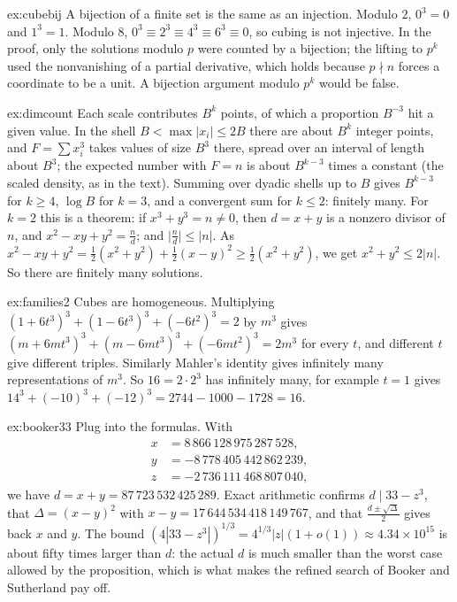 \begin{solution}{ex:cubebij}
\idea A bijection of a finite set is the same as an injection.
\writeup Modulo $2$, $0^3=0$ and $1^3=1$. Modulo $8$, $0^3\equiv2^3\equiv4^3\equiv6^3\equiv0$, so cubing is not injective. In the proof, only the solutions modulo $p$ were counted by a bijection; the lifting to $p^k$ used the
nonvanishing of a partial derivative, which holds because $p\nmid n$ forces a coordinate to be a unit. A bijection argument modulo $p^k$ would be false.
\end{solution}

\begin{solution}{ex:dimcount}
\idea Each scale contributes $B^{k}$ points, of which a proportion $B^{-3}$ hit a given value.
\writeup In the shell $B<\max|x_i|\le2B$ there are about $B^k$ integer points, and $F=\sum x_i^3$ takes values of size $B^3$ there, spread over an interval of length about $B^3$; the expected number with $F=n$ is
about $B^{k-3}$ times a constant (the scaled density, as in the text). Summing over dyadic shells up to $B$ gives $B^{k-3}$ for $k\ge4$, $\log B$ for $k=3$, and a convergent sum for $k\le2$: finitely many.
For $k=2$ this is a theorem: if $x^3+y^3=n\ne0$, then $d=x+y$ is a nonzero divisor of $n$, and $x^2-xy+y^2=\frac nd$; and $\bigl|\frac nd\bigr|\le|n|$. As $x^2-xy+y^2=\frac12(x^2+y^2)+\frac12(x-y)^2\ge\frac12(x^2+y^2)$, we get $x^2+y^2\le2|n|$. So there are finitely many solutions.
\end{solution}

\begin{solution}{ex:families2}
\idea Cubes are homogeneous.
\writeup Multiplying $(1+6t^3)^3+(1-6t^3)^3+(-6t^2)^3=2$ by $m^3$ gives $(m+6mt^3)^3+(m-6mt^3)^3+(-6mt^2)^3=2m^3$ for every $t$, and different $t$ give different triples. Similarly Mahler's identity gives infinitely
many representations of $m^3$. So $16=2\cdot2^3$ has infinitely many, for example $t=1$ gives $14^3+(-10)^3+(-12)^3=2744-1000-1728=16$.
\end{solution}

\begin{solution}{ex:booker33}
\idea Plug into the formulas.
\writeup With
\[
\begin{aligned}
x&=8\,866\,128\,975\,287\,528,\\
y&=-8\,778\,405\,442\,862\,239,\\
z&=-2\,736\,111\,468\,807\,040,
\end{aligned}
\]
we have $d=x+y=87\,723\,532\,425\,289$. Exact arithmetic confirms $d\mid33-z^3$, that
$\Delta=(x-y)^2$ with $x-y=17\,644\,534\,418\,149\,767$, and that $\frac{d\pm\sqrt\Delta}2$ gives back $x$ and $y$. The bound $(4|33-z^3|)^{1/3}=4^{1/3}|z|(1+o(1))\approx4.34\times10^{15}$ is about fifty times larger than $d$: the actual
$d$ is much smaller than the worst case allowed by the proposition, which is what makes the refined search of Booker and Sutherland pay off.
\end{solution}


